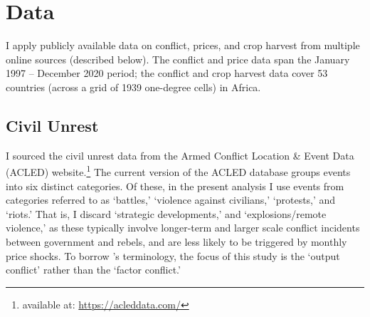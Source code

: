 \documentclass[11pt]{article}
\begin{document}

\section{Data}

I apply publicly available data on conflict, prices, and crop harvest from multiple online sources (described below). The conflict and price data span the January 1997 -- December 2020 period; the conflict and crop harvest data cover 53 countries (across a grid of 1939 one-degree cells) in Africa.

\subsection{Civil Unrest}
I sourced the civil unrest data from the Armed Conflict Location \& Event Data (ACLED) website.\footnote{available at: \href{https://acleddata.com/}{https://acleddata.com/}} The current version of the ACLED database groups events into six distinct categories. Of these, in the present analysis I use events from categories referred to as `battles,' `violence against civilians,' `protests,' and `riots.' That is, I discard `strategic developments,' and `explosions/remote violence,' as these typically involve longer-term and larger scale conflict incidents between government and rebels, and are less likely to be triggered by monthly price shocks. To borrow \cite{mcguirk2020}'s terminology, the focus of this study is the `output conflict' rather than the `factor conflict.' 
\end{document}
